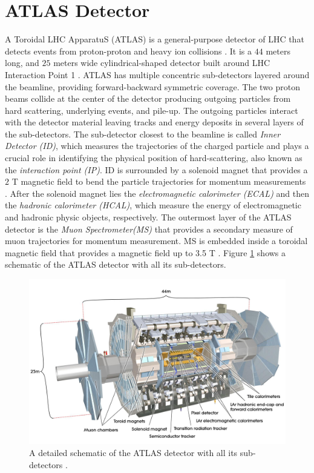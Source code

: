 \section{ATLAS Detector}
\label{sec:ATLAS}

A Toroidal LHC ApparatuS (ATLAS) is a general-purpose detector of LHC that detects events from proton-proton and heavy ion collisions \cite{ATLAS}. It is a $44$ meters long, and $25$ meters wide cylindrical-shaped detector built around LHC Interaction Point 1 \cite{ATLAS}. ATLAS has multiple concentric sub-detectors layered around the beamline, providing forward-backward symmetric coverage. The two proton beams collide at the center of the detector producing outgoing particles from hard scattering, underlying events, and pile-up. The outgoing particles interact with the detector material leaving tracks and energy deposits in several layers of the sub-detectors. The sub-detector closest to the beamline is called \textit{Inner Detector (ID)}, which measures the trajectories of the charged particle and plays a crucial role in identifying the physical position of hard-scattering, also known as the \textit{interaction point (IP)}. ID is surrounded by a solenoid magnet that provides a $2$ T magnetic field to bend the particle trajectories for momentum measurements \cite{ATLAS}. After the solenoid magnet lies the \textit{electromagnetic calorimeter (ECAL)} and then the \textit{hadronic calorimeter (HCAL)}, which measure the energy of electromagnetic and hadronic physic objects, respectively. The outermost layer of the ATLAS detector is the \textit{Muon Spectrometer(MS)} that provides a secondary measure of muon trajectories for momentum measurement. MS is embedded inside a toroidal magnetic field that provides a magnetic field up to 3.5 T \cite{ATLAS}. Figure \ref{fig:ATLAS} shows a schematic of the ATLAS detector with all its sub-detectors.

\begin{figure}
    \centering
    \includegraphics[width=.98\linewidth]{figures/LHC/AtlasDetector.png}
    \caption{ A detailed schematic of the ATLAS detector with all its sub-detectors \cite{ATLAS}.\label{fig:ATLAS}}
\end{figure}

